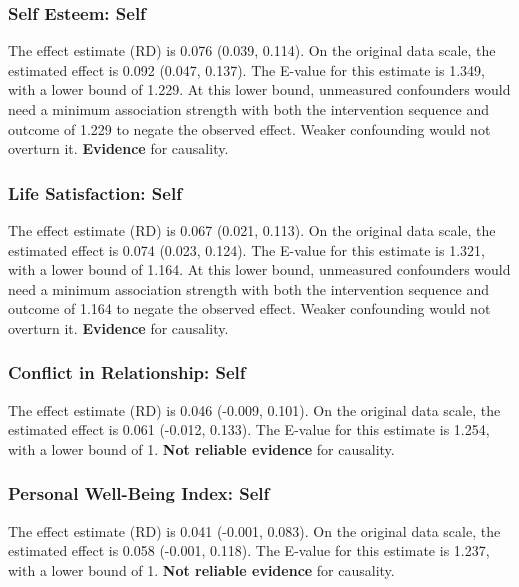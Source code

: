 \documentclass[
  singlecolumn]{article}
\begin{document}
\subsubsection{Self Esteem: Self}\label{self-esteem-self-4}

The effect estimate (RD) is 0.076 (0.039, 0.114). On the original data
scale, the estimated effect is 0.092 (0.047, 0.137). The E-value for
this estimate is 1.349, with a lower bound of 1.229. At this lower
bound, unmeasured confounders would need a minimum association strength
with both the intervention sequence and outcome of 1.229 to negate the
observed effect. Weaker confounding would not overturn it.
\textbf{Evidence} for causality.

\subsubsection{Life Satisfaction: Self}\label{life-satisfaction-self-4}

The effect estimate (RD) is 0.067 (0.021, 0.113). On the original data
scale, the estimated effect is 0.074 (0.023, 0.124). The E-value for
this estimate is 1.321, with a lower bound of 1.164. At this lower
bound, unmeasured confounders would need a minimum association strength
with both the intervention sequence and outcome of 1.164 to negate the
observed effect. Weaker confounding would not overturn it.
\textbf{Evidence} for causality.

\subsubsection{Conflict in Relationship:
Self}\label{conflict-in-relationship-self-4}

The effect estimate (RD) is 0.046 (-0.009, 0.101). On the original data
scale, the estimated effect is 0.061 (-0.012, 0.133). The E-value for
this estimate is 1.254, with a lower bound of 1. \textbf{Not reliable
evidence} for causality.

\subsubsection{Personal Well-Being Index:
Self}\label{personal-well-being-index-self-4}

The effect estimate (RD) is 0.041 (-0.001, 0.083). On the original data
scale, the estimated effect is 0.058 (-0.001, 0.118). The E-value for
this estimate is 1.237, with a lower bound of 1. \textbf{Not reliable
evidence} for causality.
\end{document}
